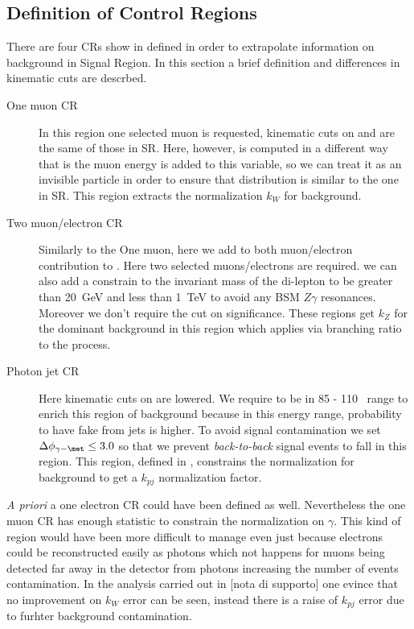\subsection{Definition of Control Regions}

There are four CRs show in \Fig{\ref{fig:regions}} defined in order to extrapolate information on background in Signal Region. In this section a brief definition and differences in kinematic cuts are descrbed.

\begin{description}
\item [One muon CR] In this region one selected muon is requested, kinematic cuts on \pt and \met are the same of those in SR. Here, however, \met is computed in a different way that is the muon energy is added to this variable, so we can treat it as an invisible particle in order to ensure that \met distribution is similar to the one in SR. This region extracts the normalization $k_W$ for \wg background.
\item [Two muon/electron CR] Similarly to the One muon, here we add to \met both muon/electron contribution to \met. Here two selected muons/electrons are required. we can also add a constrain to the invariant mass of the di-lepton to be greater than \SI{20}{\GeV} and less than \SI{1}{\TeV} to avoid any BSM $Z\gamma$ resonances. Moreover we don't require the cut on \met significance. These regions get $k_Z$ for the dominant background \zg in this region which applies via branching ratio to the \znng process.
\item [Photon jet CR] Here kinematic cuts on \met are lowered. We require \met to be in 85 - 110 \GeV\, range to enrich this region of \gj background because in this energy range, probability to have fake \met from jets is higher. To avoid signal contamination we set $\Delta\phi_{\gamma - \met} \le 3.0$ so that we prevent {\itshape back-to-back} signal events to fall in this region. This region, defined in \RunTwo, constrains the normalization for \gj background to get a $k_{pj}$ normalization factor.
\end{description}

{\itshape A priori} a one electron CR could have been defined as well. Nevertheless the one muon CR has enough statistic to constrain the normalization on \Wboson$\gamma$.  This kind of region would have been more difficult to manage even just because electrons could be reconstructed easily as photons which not happens for muons being detected far away in the detector from photons increasing the number of \gj events contamination. In the analysis carried out in [nota di supporto] one evince that no improvement on $k_W$ error can be seen, instead there is a raise of $k_{pj}$ error due to furhter background contamination.

